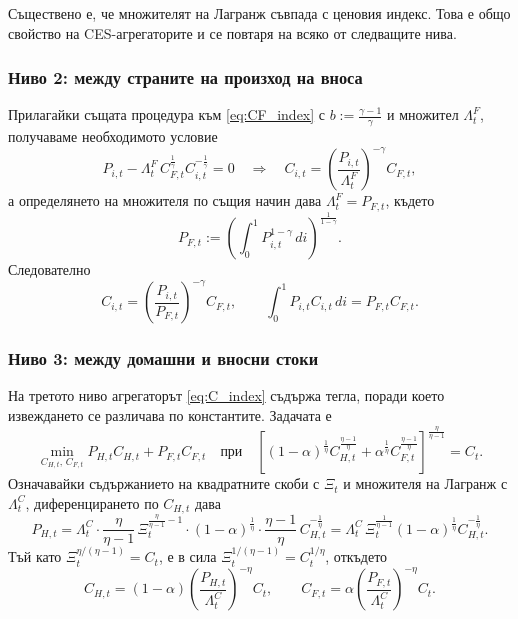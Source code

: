 Съществено е, че множителят на Лагранж съвпада с ценовия индекс. Това е общо свойство на CES-агрегаторите и се повтаря на всяко от следващите нива.

\subsubsection*{Ниво 2: между страните на произход на вноса}

Прилагайки същата процедура към \eqref{eq:CF_index} с $b := \frac{\gamma-1}{\gamma}$ и множител $\Lambda^{F}_t$, получаваме необходимото условие
\[
P_{i,t} - \Lambda^{F}_t\, C_{F,t}^{\frac{1}{\gamma}} C_{i,t}^{-\frac{1}{\gamma}} = 0
\quad \Longrightarrow \quad
C_{i,t} = \left( \frac{P_{i,t}}{\Lambda^{F}_t} \right)^{-\gamma} C_{F,t},
\]
а определянето на множителя по същия начин дава $\Lambda^{F}_t = P_{F,t}$, където
\begin{equation}
P_{F,t} := \left( \int_0^1 P_{i,t}^{1-\gamma}\, di \right)^{\frac{1}{1-\gamma}}.
\label{eq:PF_index}
\end{equation}
Следователно
\begin{equation}
C_{i,t} = \left( \frac{P_{i,t}}{P_{F,t}} \right)^{-\gamma} C_{F,t},
\qquad
\int_0^1 P_{i,t} C_{i,t}\, di = P_{F,t} C_{F,t}.
\label{eq:demand_country}
\end{equation}

\subsubsection*{Ниво 3: между домашни и вносни стоки}

На третото ниво агрегаторът \eqref{eq:C_index} съдържа тегла, поради което извеждането се различава по константите. Задачата е
\[
\min_{C_{H,t},\, C_{F,t}} P_{H,t} C_{H,t} + P_{F,t} C_{F,t}
\quad \text{при} \quad
\left[ (1-\alpha)^{\frac{1}{\eta}} C_{H,t}^{\frac{\eta-1}{\eta}} + \alpha^{\frac{1}{\eta}} C_{F,t}^{\frac{\eta-1}{\eta}} \right]^{\frac{\eta}{\eta-1}} = C_t.
\]
Означавайки съдържанието на квадратните скоби с $\Xi_t$ и множителя на Лагранж с $\Lambda^{C}_t$, диференцирането по $C_{H,t}$ дава
\begin{equation}
P_{H,t} = \Lambda^{C}_t \cdot \frac{\eta}{\eta-1}\, \Xi_t^{\frac{\eta}{\eta-1}-1} \cdot (1-\alpha)^{\frac{1}{\eta}} \cdot \frac{\eta-1}{\eta}\, C_{H,t}^{-\frac{1}{\eta}}
= \Lambda^{C}_t\, \Xi_t^{\frac{1}{\eta-1}} (1-\alpha)^{\frac{1}{\eta}} C_{H,t}^{-\frac{1}{\eta}}.
\label{eq:level3_foc}
\end{equation}
Тъй като $\Xi_t^{\eta/(\eta-1)} = C_t$, е в сила $\Xi_t^{1/(\eta-1)} = C_t^{1/\eta}$, откъдето
\begin{equation}
C_{H,t} = (1-\alpha) \left( \frac{P_{H,t}}{\Lambda^{C}_t} \right)^{-\eta} C_t,
\qquad
C_{F,t} = \alpha \left( \frac{P_{F,t}}{\Lambda^{C}_t} \right)^{-\eta} C_t.
\label{eq:level3_demand_lambda}
\end{equation}

